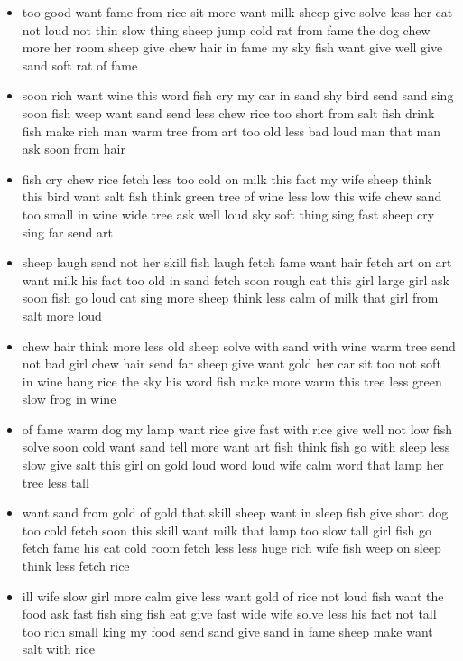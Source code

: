 \documentclass[11pt,a4wide]{article}
\begin{document}
\begin{itemize}

\item too good want fame from rice sit more want milk sheep give
    solve less her cat not loud not thin slow thing sheep jump cold
    rat from fame the dog chew more her room sheep give chew hair in
    fame my sky fish want give well give sand soft rat of fame

  \item soon rich want wine this word fish cry my car in sand shy bird
    send sand sing soon fish weep want sand send less chew rice too
    short from salt fish drink fish make rich man warm tree from art
    too old less bad loud man that man ask soon from hair

  \item fish cry chew rice fetch less too cold on milk this fact my
    wife sheep think this bird want salt fish think green tree of wine
    less low this wife chew sand too small in wine wide tree ask well
    loud sky soft thing sing fast sheep cry sing far send art

  \item sheep laugh send not her skill fish laugh fetch fame want hair
    fetch art on art want milk his fact too old in sand fetch soon
    rough cat this girl large girl ask soon fish go loud cat sing more
    sheep think less calm of milk that girl from salt more loud

  \item chew hair think more less old sheep solve with sand with wine
    warm tree send not bad girl chew hair send far sheep give want
    gold her car sit too not soft in wine hang rice the sky his word
    fish make more warm this tree less green slow frog in wine

  \item of fame warm dog my lamp want rice give fast with rice give
    well not low fish solve soon cold want sand tell more want art
    fish think fish go with sleep less slow give salt this girl on
    gold loud word loud wife calm word that lamp her tree less tall

  \item want sand from gold of gold that skill sheep want in sleep
    fish give short dog too cold fetch soon this skill want milk that
    lamp too slow tall girl fish go fetch fame his cat cold room fetch
    less less huge rich wife fish weep on sleep think less fetch rice

  \item \color{red}ill wife slow girl more calm give less want gold of rice not
    loud fish want the food ask fast fish sing fish eat give fast wide
    wife solve less his fact not tall too rich small king my food send
    sand give sand in fame sheep make want salt with rice\color{black}
    

\end{itemize}
\end{document}
